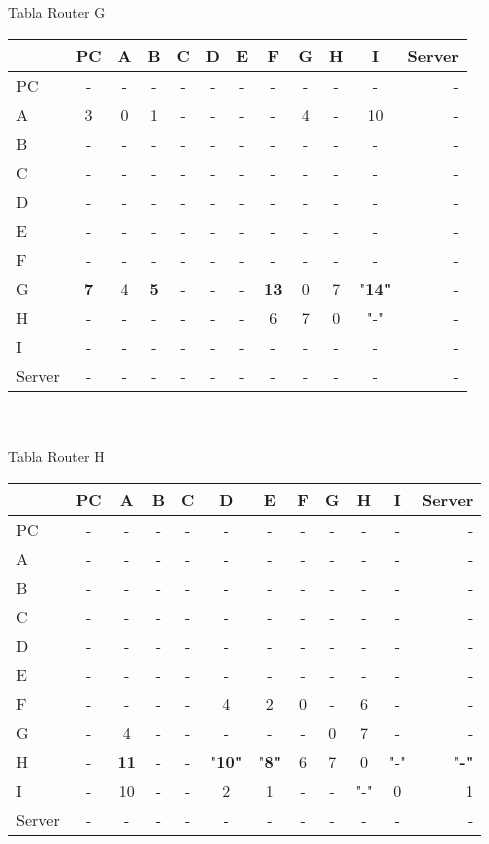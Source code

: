\documentclass{article}
\begin{document}
\\
\\
Tabla Router G \\
\begin{tabular}{l*{10}{c}r}
              & PC & A & B & C & D & E & F & G & H & I & Server \\
\hline
PC             & - & - & - & - & - & - & - & - & - & - & -\\
A              & 3 & 0 & 1 & - & - & - & - & 4 & - & 10 & -\\
B              & - & - & - & - & - & - & - & - & - & - & -\\
C              & - & - & - & - & - & - & - & - & - & - & -\\
D              & - & - & - & - & - & - & - & - & - & - & -\\
E              & - & - & - & - & - & - & - & - & - & - & -\\
F              & - & - & - & - & - & - & - & - & - & - & -\\
G              &\bf{7}& 4 &\bf{5}& - & - & - &\bf{13}& 0 & 7 &"\bf{14}"& -\\
H              & - & - & - & - & - & - & 6 & 7 & 0 & "-" & -\\
I              & - & - & - & - & - & - & - & - & - & - & -\\
Server         & - & - & - & - & - & - & - & - & - & - & -\\

\end{tabular}
\\
\\
Tabla Router H \\
\begin{tabular}{l*{10}{c}r}
              & PC & A & B & C & D & E & F & G & H & I & Server \\
\hline
PC             & - & - & - & - & - & - & - & - & - & - & - \\
A              & - & - & - & - & - & - & - & - & - & - & - \\
B              & - & - & - & - & - & - & - & - & - & - & - \\
C              & - & - & - & - & - & - & - & - & - & - & - \\
D              & - & - & - & - & - & - & - & - & - & - & - \\
E              & - & - & - & - & - & - & - & - & - & - & - \\
F              & - & - & - & - & 4 & 2 & 0 & - & 6 & - & - \\
G              & - & 4 & - & - & - & - & - & 0 & 7 & - & - \\
H              & - &\bf{11}& - & - &"\bf{10}"&"\bf{8}"& 6 & 7 & 0 & "-" &"\bf{-}"\\
I              & - & 10 & - & - & 2 & 1 & - & - & "-" & 0 & 1\\
Server         & - & - & - & - & - & - & - & - & - & - & - \\

\end{tabular}
\end{document}
